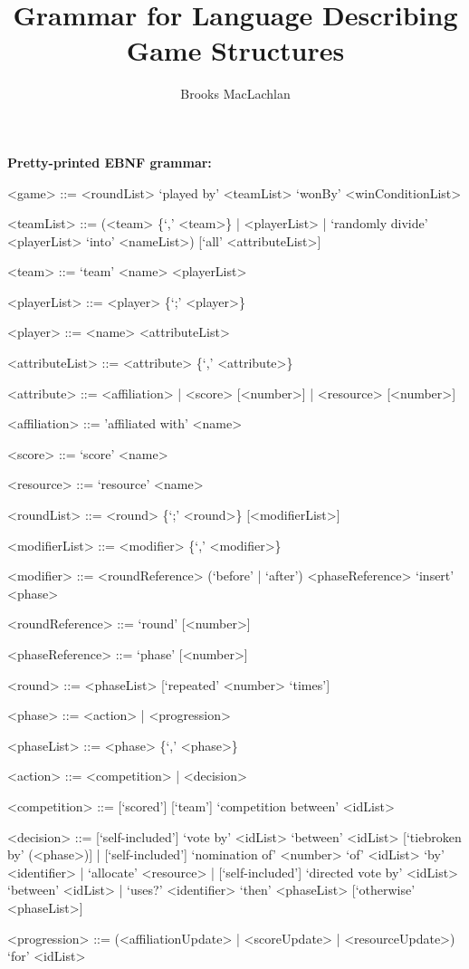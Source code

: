 \documentclass{article}
\title{Grammar for Language Describing Game Structures}
\author{Brooks MacLachlan}
\begin{document}
\maketitle

\noindent \textbf{Pretty-printed EBNF grammar:}
\begin{grammar}
<game> ::= <roundList> `played by' <teamList> `wonBy' <winConditionList>

<teamList> ::= (<team> \{`,' <team>\} | <playerList> | `randomly divide' 
<playerList> `into' <nameList>) [`all' <attributeList>]

<team> ::= `team' <name> <playerList>

<playerList> ::= <player> \{`;' <player>\}

<player> ::= <name> <attributeList>

<attributeList> ::= <attribute> \{`,' <attribute>\}

<attribute> ::= <affiliation> | <score> [<number>] | <resource> [<number>]

<affiliation> ::= 'affiliated with' <name>

<score> ::= `score' <name>

<resource> ::= `resource' <name>

<roundList> ::= <round> \{`;' <round>\} [<modifierList>]

<modifierList> ::= <modifier> \{`,' <modifier>\}

<modifier> ::= <roundReference> (`before' | `after') <phaseReference> `insert' 
<phase>

<roundReference> ::= `round' [<number>]

<phaseReference> ::= `phase' [<number>]

<round> ::= <phaseList> [`repeated' <number> `times']

<phase> ::= <action> | <progression>

<phaseList> ::= <phase> \{`,' <phase>\}

<action> ::= <competition> | <decision>

<competition> ::= [`scored'] [`team'] `competition between' <idList>

<decision> ::= [`self-included'] `vote by' <idList> `between' <idList> 
[`tiebroken by' 
(<phase>)] | [`self-included'] `nomination of' <number> 
`of' <idList> `by' <identifier> | `allocate' <resource> | [`self-included'] 
`directed vote by' <idList> `between' <idList> | `uses?' <identifier> `then' 
<phaseList> [`otherwise' <phaseList>]

<progression> ::= (<affiliationUpdate> | <scoreUpdate>  | <resourceUpdate>) 
`for' <idList>


\end{grammar}
\end{document}
